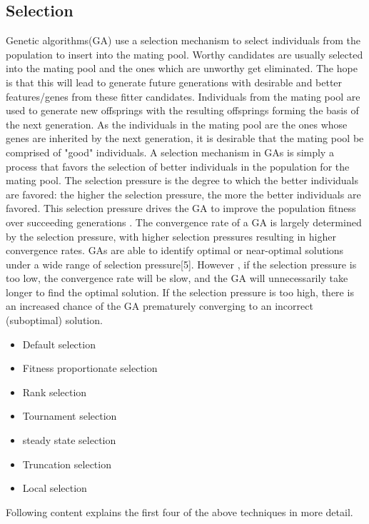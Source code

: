 \documentclass[a4paper, 12pt]{article}
\begin{document}
\subsection{Selection}
Genetic algorithms(GA) use a selection mechanism to select individuals from the population to insert into the mating pool. Worthy candidates are usually selected into the mating pool and the ones which are unworthy get eliminated. The hope is that this will lead to generate future generations with desirable and better features/genes from these fitter candidates. Individuals from the mating pool are used to generate new offsprings with the resulting offsprings forming the basis of the next generation. As the individuals in the mating pool are the ones whose genes are inherited by the next generation, it is desirable that the mating pool be comprised of "good" individuals. A selection mechanism in GAs is simply a process that favors the selection of better individuals in the population for the mating pool. 
The selection pressure is the degree to which the better individuals are favored: the higher the selection pressure, the more the better
individuals are favored. This selection pressure drives the GA to improve the population fitness over succeeding generations . The convergence
rate of a GA is largely determined by the selection pressure, with higher selection pressures resulting in higher convergence rates. GAs are 
able to identify optimal or near-optimal solutions under a wide range of selection pressure[5]. However , if the selection pressure is too low, the convergence rate will be slow, and the GA will unnecessarily take longer to find the optimal solution. If the selection pressure is too 
high, there is an increased chance of the GA prematurely converging to an incorrect (suboptimal) solution.
\begin{itemize}
\item Default selection
\item Fitness proportionate selection
\item Rank selection
\item Tournament selection
\item steady state selection
\item Truncation selection
\item Local selection
\end{itemize}
Following content explains the first four of the above techniques in more detail.
\newpage
\end{document}
